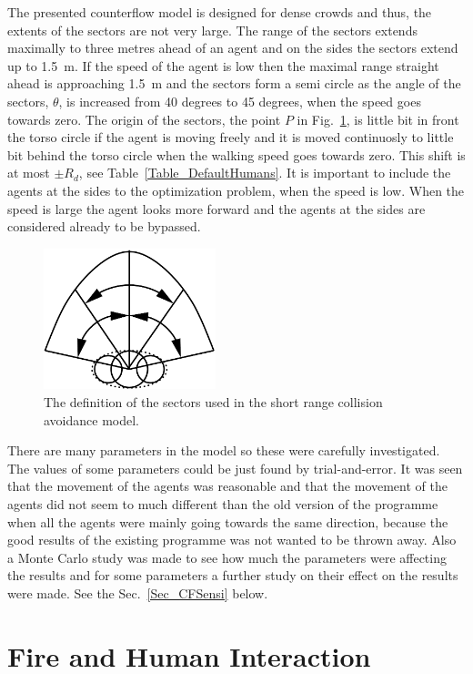\documentclass[12pt,a4paper,final,twoside]{stylevk}
\begin{document}
The presented counterflow model is designed for dense crowds and thus,
the extents of the sectors are not very large.  The range of the
sectors extends maximally to three metres ahead of an agent and on the
sides the sectors extend up to 1.5~m.  If the speed of the agent is
low then the maximal range straight ahead is approaching 1.5~m and the
sectors form a semi circle as the angle of the sectors, $\theta$, is
increased from 40 degrees to 45 degrees, when the speed goes towards
zero.  The origin of the sectors, the point $P$ in
Fig.~\ref{Fig_CFsectors}, is little bit in front the torso circle if
the agent is moving freely and it is moved continuosly to little bit
behind the torso circle when the walking speed goes towards zero.
This shift is at most $\pm R_d$, see Table~\ref{Table_DefaultHumans}.
It is important to include the agents at the sides to the optimization
problem, when the speed is low.  When the speed is large the agent
looks more forward and the agents at the sides are considered already
to be bypassed.


%
\begin{figure}[!tb]
  \centerline{ \includegraphics[clip=true, width=50mm]{FIGURES/CF_Sectors}} 
  \caption{The definition of the sectors used in the short range
    collision avoidance model.}\label{Fig_CFsectors}
\end{figure}


There are many parameters in the model so these were carefully
investigated.  The values of some parameters could be just found by
trial-and-error.  It was seen that the movement of the agents was
reasonable and that the movement of the agents did not seem to much
different than the old version of the programme when all the agents
were mainly going towards the same direction, because the good results
of the existing programme was not wanted to be thrown away.  Also a
Monte Carlo study was made to see how much the parameters were
affecting the results and for some parameters a further study on their
effect on the results were made.  See the Sec.~\ref{Sec_CFSensi}
below.


\section{Fire and Human Interaction}\label{Sec_FireHumanInt}
\end{document}
